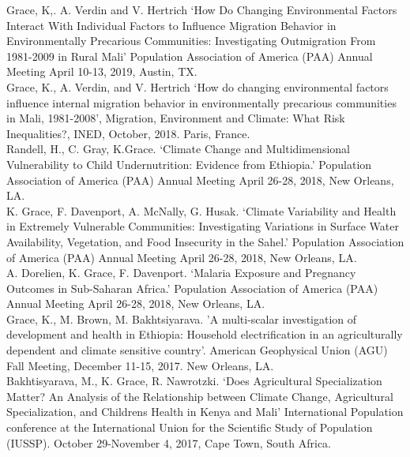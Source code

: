 \documentclass[11pt]{article} %
\begin{document}
\noindent
Grace, K,. A. Verdin and V. Hertrich `How Do Changing Environmental Factors Interact With Individual Factors to Influence Migration Behavior in Environmentally Precarious Communities: Investigating Outmigration From 1981-2009 in Rural Mali' Population Association of America (PAA) Annual Meeting April 10-13, 2019, Austin, TX.\\

\noindent 
Grace, K., A. Verdin, and V. Hertrich `How do changing environmental factors influence internal migration behavior in environmentally precarious communities in Mali, 1981-2008', Migration, Environment and Climate: What Risk Inequalities?, INED, October, 2018.  Paris, France. \\

\noindent
Randell, H., C. Gray, K.Grace. `Climate Change and Multidimensional Vulnerability to Child Undernutrition: Evidence from Ethiopia.' Population Association of America (PAA) Annual Meeting April 26-28, 2018, New Orleans, LA.\\

\noindent
K. Grace, F. Davenport, A. McNally, G. Husak. `Climate Variability and Health in Extremely Vulnerable Communities: Investigating Variations in Surface Water Availability, Vegetation, and Food Insecurity in the Sahel.' Population Association of America (PAA) Annual Meeting April 26-28, 2018, New Orleans, LA.\\

\noindent
A. Dorelien, K. Grace, F. Davenport. `Malaria Exposure and Pregnancy Outcomes in Sub-Saharan Africa.' Population Association of America (PAA) Annual Meeting April 26-28, 2018, New Orleans, LA.\\


\noindent
Grace, K., M. Brown, M. Bakhtsiyarava. 'A multi-scalar investigation of development and health in Ethiopia: Household electrification in an agriculturally dependent and climate sensitive country'. American Geophysical Union (AGU) Fall Meeting, December 11-15, 2017. New Orleans, LA.\\

\noindent
Bakhtisyarava, M., K. Grace, R. Nawrotzki. `Does Agricultural Specialization Matter? An Analysis of the Relationship between Climate Change, Agricultural Specialization, and Childrens Health in Kenya and Mali' International Population conference at the International Union for the Scientific Study of Population (IUSSP). October 29-November 4, 2017, Cape Town, South Africa.\\
\end{document}
